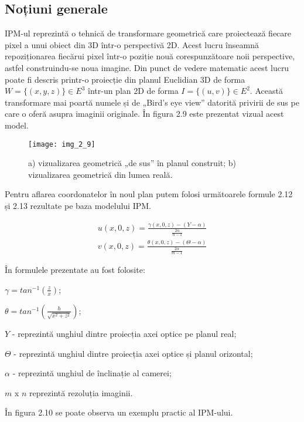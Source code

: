 \subsection{Noțiuni generale}

IPM-ul reprezintă o tehnică de transformare geometrică care proiectează fiecare pixel a unui obiect din 3D într-o perspectivă 2D. Acest lucru înseamnă repoziționarea fiecărui pixel într-o poziție nouă corespunzătoare noii perspective, astfel construindu-se noua imagine. Din punct de vedere matematic acest lucru poate fi descris printr-o proiecție din planul Euclidian 3D de forma $W = \{(x,y,z)\} \in E^3$ într-un plan 2D de forma $I = \{(u,v)\} \in E^2$. Această transformare mai poartă numele și de „Bird's eye view” datorită privirii de sus pe care o oferă asupra imaginii originale. În figura 2.9 este prezentat vizual acest model.

\begin{figure}[!h]
	\centering
	\texttt{[image: img\_2\_9]}
	\caption[Modelul IPM]{a) vizualizarea geometrică „de sus” în planul construit; b) vizualizarea geometrică din lumea reală.}
	\label{fig:nonfloat}
\end{figure}

Pentru aflarea coordonatelor în noul plan putem folosi următoarele formule 2.12 și 2.13 rezultate pe baza modelului IPM.

\begin{align}	
	u(x,0,z) = \frac{\gamma(x,0,z) - (Y-\alpha)}{\frac{2\alpha}{n-1}}
\end{align}
\begin{align}	
	v(x,0,z) = \frac{\theta(x,0,z) - (\Theta - \alpha)}{\frac{2\alpha}{m-1}}
\end{align}

În formulele prezentate au fost folosite:

$\gamma = tan^{-1}(\frac{z}{x})$;

$\theta = tan^{-1}(\frac{h}{\sqrt{x^2+z^2}})$;

$Y$ - reprezintă unghiul dintre proiecția axei optice pe planul real; 

$\Theta$ - reprezintă unghiul dintre proiecția axei optice și planul orizontal;
 
$\alpha$ - reprezintă unghiul de înclinație al camerei;

$m$ x $n$ reprezintă rezoluția imaginii.

În figura 2.10 se poate observa un exemplu practic al IPM-ului.

